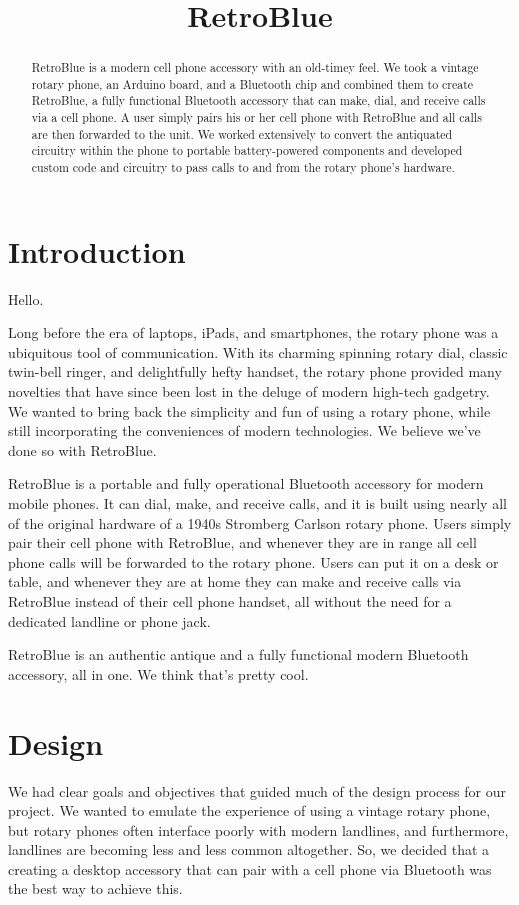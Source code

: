 \documentclass{es50report}
\title{RetroBlue}
\begin{document}
    \maketitlepage

    \begin{abstract}
        RetroBlue is a modern cell phone accessory with an old-timey feel. We took a vintage rotary phone, an Arduino board, and a Bluetooth chip and combined them to create RetroBlue, a fully functional Bluetooth accessory that can make, dial, and receive calls via a cell phone. A user simply pairs his or her cell phone with RetroBlue and all calls are then forwarded to the unit. We worked extensively to convert the antiquated circuitry within the phone to portable battery-powered components and developed custom code and circuitry to pass calls to and from the rotary phone's hardware.
    \end{abstract}
    \newpage

    \section{Introduction}
    Hello. 
    
    Long before the era of laptops, iPads, and smartphones, the rotary phone was a ubiquitous tool of communication. With its charming spinning rotary dial, classic twin-bell ringer, and delightfully hefty handset,  the rotary phone provided many novelties that have since been lost in the deluge of modern high-tech gadgetry. We wanted to bring back the simplicity and fun of using a rotary phone, while still incorporating the conveniences of modern technologies. We believe we've done so with RetroBlue.
    
    RetroBlue is a portable and fully operational Bluetooth accessory for modern mobile phones. It can dial, make, and receive calls, and it is built using nearly all of the original hardware of a 1940s Stromberg Carlson rotary phone. Users simply pair their cell phone with RetroBlue, and whenever they are in range all cell phone calls will be forwarded to the rotary phone. Users can put it on a desk or table, and whenever they are at home they can make and receive calls via RetroBlue instead of their cell phone handset, all without the need for a dedicated landline or phone jack. 
    
    RetroBlue is an authentic antique and a fully functional modern Bluetooth accessory, all in one. We think that's pretty cool.

    \section{Design}
        We had clear goals and objectives that guided much of the design process for our project. We wanted to emulate the experience of using a vintage rotary phone, but rotary phones often interface poorly with modern landlines, and furthermore, landlines are becoming less and less common altogether. So, we decided that a creating a desktop accessory that can pair with a cell phone via Bluetooth was the best way to achieve this.
        
\end{document}
